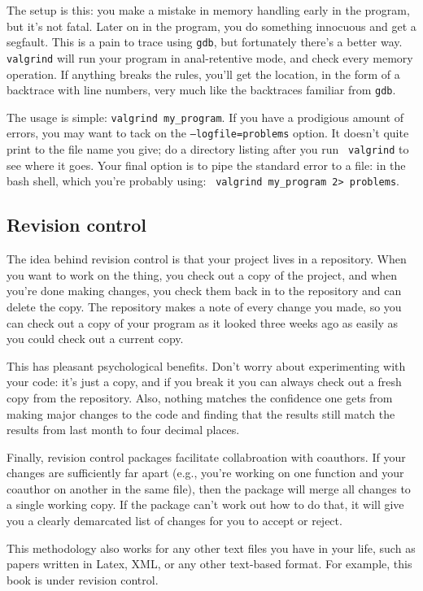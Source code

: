 \documentclass[12pt]{article}
\begin{document}
The setup is this: you make a mistake in memory handling early in the program, but
it's not fatal. Later on in the program, you do something innocuous and get a
segfault. This is a pain to trace using {\tt gdb}, but fortunately there's a
better way. {\tt valgrind} will run your program in anal-retentive mode, and check
every memory operation. If anything breaks the rules, you'll get the location, in
the form of a backtrace with line numbers, very much like the backtraces familiar
from {\tt gdb}.

The usage is simple: {\tt valgrind my\_program}. If you have a prodigious amount
of errors, you may want to tack on the {\tt --logfile=problems} option. It doesn't
quite print to the file name you give; do a directory listing after you run {\tt
valgrind} to see where it goes.  Your final option is to pipe the standard
error to a file: in the bash shell, which you're probably using: {\tt
valgrind my\_program 2> problems}.

\subsection{Revision control}  
The idea behind revision control is that your project lives in a
repository. When you want to work on the thing, you check out a copy
of the project, and when you're done making changes, you check them back
in to the repository and can delete the copy.  The repository makes a note
of every change you made, so you can check out a copy of your program as
it looked three weeks ago as easily as you could check out a current copy.

This has pleasant psychological benefits. Don't worry about experimenting
with your code: it's just a copy, and if you break it you can always check
out a fresh copy from the repository. Also, nothing matches the confidence
one gets from making major changes to the code and finding that the
results still match the results from last month to four decimal places.


Finally, revision control packages facilitate collabroation with
coauthors. If your changes are sufficiently far apart (e.g., you're
working on one function and your coauthor on another in the same file),
then the package will merge all changes to a single working copy. If
the package can't work out how to do that, it will give you a clearly
demarcated list of changes for you to accept or reject.

This methodology also works for any other text files you have in your
life, such as papers written in Latex, XML, or any other text-based
format. For example, this book is under revision control.
\end{document}
